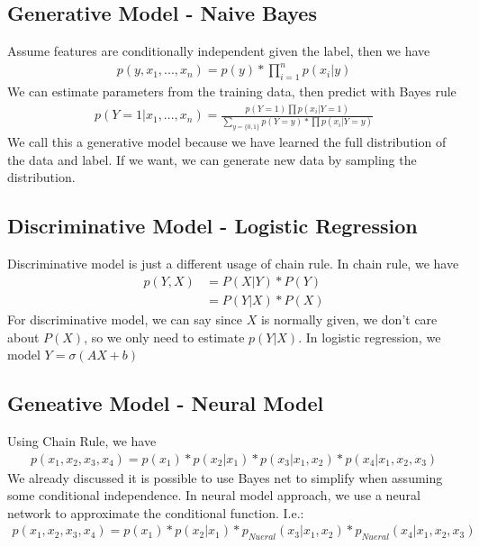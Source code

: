\subsection{Generative Model - Naive Bayes}
Assume features are conditionally independent given the label, then we have 
    \begin{align*}
    p(y, x_1, ...,x_n) = p(y) * \prod_{i=1}^{n} p(x_i|y)
    \end{align*}
We can estimate parameters from the training data, then predict with Bayes rule
    \begin{align*}
        p(Y=1|x_1,...,x_n) = \frac{p(Y=1)\prod p(x_i|Y=1)}{\sum_{y=\{0,1\}} p(Y=y)*\prod p(x_i|Y=y)}
    \end{align*}
We call this a generative model because we have learned the full distribution of the data and label. If we want, we can generate new data by sampling the distribution. 

\subsection{Discriminative Model - Logistic Regression} 
Discriminative model is just a different usage of chain rule. In chain rule, we have 
    \begin{align*}
        p(Y,X) 
        &= P(X|Y) * P(Y) \tag{Generative Model} \\
        &= P(Y|X) * P(X) \tag{Discriminative Model} 
    \end{align*}
For discriminative model, we can say since $X$ is normally given, we don't care about $P(X)$, so we only need to estimate $p(Y|X)$. In logistic regression, we model $Y = \sigma(AX+b)$

\subsection{Geneative Model - Neural Model} 
Using Chain Rule, we have 
    \begin{align*}
        p(x_1, x_2, x_3, x_4) = p(x_1) * p(x_2|x_1) * p(x_3|x_1, x_2) * p(x_4 | x_1, x_2, x_3)
    \end{align*}
We already discussed it is possible to use Bayes net to simplify when assuming some conditional independence. In neural model approach, we use a neural network to approximate the conditional function. I.e.: 
    \begin{align*}
        p(x_1, x_2, x_3, x_4) = p(x_1) * p(x_2|x_1) * p_{Nueral}(x_3|x_1, x_2) * p_{Nueral}(x_4 | x_1, x_2, x_3)
    \end{align*}    